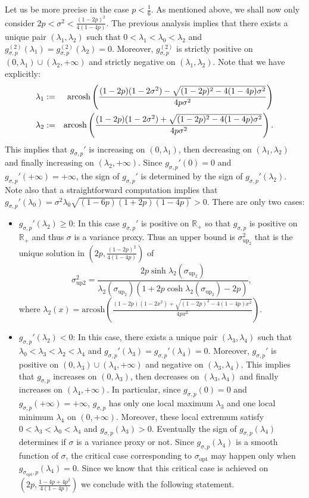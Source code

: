 \documentclass[a4paper, 10pt]{article}
\newcommand{\arcosh}{\text{arcosh}}
\newcommand{\beq}{\begin{equation}}
\newcommand{\eeq}{\end{equation}}
\newcommand{\bea}{\begin{eqnarray}}
\newcommand{\eea}{\end{eqnarray}}
\theoremstyle{definition}
\begin{document}
Let us be more precise in the case $p<\frac{1}{6}$. As mentioned above, we shall now only consider $2p<\sigma^2<\frac{(1-2p)^2}{4(1-4p)}$. The previous analysis implies that there exists a unique pair $(\lambda_1,\lambda_2)$ such that $0<\lambda_1<\lambda_0<\lambda_2$ and $g_{\sigma,p}^{(2)}(\lambda_1)=g_{\sigma,p}^{(2)}(\lambda_2)=0$. Moreover, $g_{\sigma,p}^{(2)}$ is strictly positive on $(0,\lambda_1)\cup(\lambda_2,+\infty)$ and strictly negative on $(\lambda_1,\lambda_2)$. 
Note that we have explicitly:
\bea \lambda_1&:=&\arcosh\left(  \frac{(1-2p)(1-2\sigma^2)-\sqrt{(1-2p)^2-4(1-4p)\sigma^2 } }{4p\sigma^2}\right)\cr
\lambda_2&:=&\arcosh\left(  \frac{(1-2p)(1-2\sigma^2)+\sqrt{(1-2p)^2-4(1-4p)\sigma^2 } }{4p\sigma^2}\right).
\eea
This implies that $g_{\sigma,p}'$ is increasing on $(0,\lambda_1)$, then decreasing on $(\lambda_1,\lambda_2)$ and finally increasing on $(\lambda_2,+\infty)$. Since $g_{\sigma,p}'(0)=0$ and $g_{\sigma,p}'(+\infty)=+\infty$, the sign of $g_{\sigma,p}'$ is determined by the sign of $g_{\sigma,p}'(\lambda_2)$. Note also that a straightforward computation implies that $g_{\sigma,p}'(\lambda_0)=\sigma^2 \lambda_0\sqrt{(1-6p)(1+2p)(1-4p)}>0$. There are only two cases:
\begin{itemize}
\item $g_{\sigma,p}'(\lambda_2)\geq 0$: In this case $g_{\sigma,p}'$ is positive on $\mathbb{R}_+$ so that $g_{\sigma,p}$ is positive on $\mathbb{R}_+$ and thus $\sigma$ is a variance proxy. Thus an upper bound is $\sigma^2_{\text{up}_2}$ that is the unique solution in $\left(2p,\frac{(1-2p)^2}{4(1-4p)}\right)$ of 
\beq \sigma^2_{\text{up2}}=\frac{2p\sinh\lambda_2(\sigma_{\text{up}_2})}{\lambda_2(\sigma_{\text{up}_2}) (1+2p\cosh \lambda_2(\sigma_{\text{up}_2})-2p) },\eeq
where $\lambda_2(x)=\arcosh\left(  \frac{(1-2p)(1-2x^2)+\sqrt{(1-2p)^2-4(1-4p)x^2 } }{4px^2}\right)$.
\item $g_{\sigma,p}'(\lambda_2)<0$: In this case, there exists a unique pair $(\lambda_3,\lambda_4)$ such that $\lambda_0<\lambda_3<\lambda_2<\lambda_4$ and $g_{\sigma,p}'(\lambda_3)=g_{\sigma,p}'(\lambda_4)=0$. Moreover, $g_{\sigma,p}'$ is positive on $(0,\lambda_3)\cup(\lambda_4,+\infty)$ and negative on $(\lambda_3,\lambda_4)$. This implies that $g_{\sigma,p}$ increases on $(0,\lambda_3)$, then decreases on $(\lambda_3,\lambda_4)$ and finally increases on $(\lambda_4,+\infty)$. In particular, since $g_{\sigma,p}(0)=0$ and $g_{\sigma,p}(+\infty)=+\infty$, $g_{\sigma,p}$ has only one local maximum $\lambda_3$ and one local minimum $\lambda_4$ on $(0,+\infty)$. Moreover, these local extremum satisfy $0<\lambda_3<\lambda_0<\lambda_4$ and $g_{\sigma,p}(\lambda_3)>0$. Eventually the sign of $g_{\sigma,p}(\lambda_4)$ determines if $\sigma$ is a variance proxy or not. Since $g_{\sigma,p}(\lambda_4)$ is a smooth function of $\sigma$, the critical case corresponding to $\sigma_{\mathrm{opt}}$ may happen only when $g_{\sigma_{\mathrm{opt}},p}(\lambda_4)=0$. Since we know that this critical case is achieved on $\left(2p,\frac{1-4p+4p^2}{4(1-4p)}\right)$ we conclude with the following statement.
\end{itemize}
\end{document}
